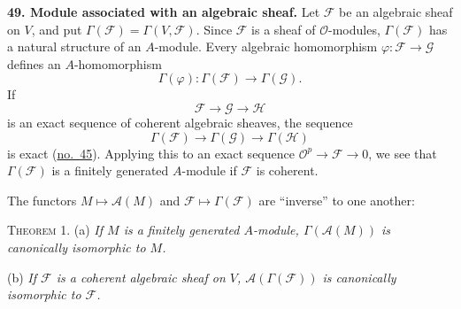 
\medskip
{}\label{fac:II:4:no:49}
\textbf{49. Module associated with an algebraic sheaf.}
\label{fac:II:4:no:49:def:global-sections-module}
Let $\mathcal{F}$ be an algebraic sheaf on $V$, and put
$\Gamma(\mathcal{F})=\Gamma(V,\mathcal{F})$. Since $\mathcal{F}$ is a sheaf
of $\mathcal{O}$-modules, $\Gamma(\mathcal{F})$ has a natural structure of
an $A$-module. Every algebraic homomorphism
$\varphi:\mathcal{F}\to\mathcal{G}$ defines an $A$-homomorphism
\[
\Gamma(\varphi):\Gamma(\mathcal{F})\longrightarrow\Gamma(\mathcal{G}).
\]
If
\[
\mathcal{F}\longrightarrow\mathcal{G}\longrightarrow\mathcal{H}
\]
is an exact sequence of coherent algebraic sheaves, the sequence
\[
\Gamma(\mathcal{F})\longrightarrow\Gamma(\mathcal{G})
\longrightarrow\Gamma(\mathcal{H})
\]
is exact (\hyperref[fac:II:3:no:45]{no.~45}). Applying this to an exact sequence
$\mathcal{O}^p\to\mathcal{F}\to0$, we see that $\Gamma(\mathcal{F})$ is a
finitely generated $A$-module if $\mathcal{F}$ is coherent.

The functors $M\mapsto\mathcal{A}(M)$ and
$\mathcal{F}\mapsto\Gamma(\mathcal{F})$ are ``inverse'' to one another:

\label{fac:II:4:thm:1}
\textsc{Theorem 1.}
\label{fac:II:4:thm:1:a}
(a) \textit{If $M$ is a finitely generated $A$-module,
$\Gamma(\mathcal{A}(M))$ is canonically isomorphic to $M$.}

\label{fac:II:4:thm:1:b}
(b) \textit{If $\mathcal{F}$ is a coherent algebraic sheaf on $V$,
$\mathcal{A}(\Gamma(\mathcal{F}))$ is canonically isomorphic to
$\mathcal{F}$.}

